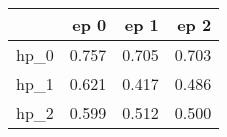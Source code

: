 \begin{tabular}{lrrr}
\toprule
{} &   ep 0 &   ep 1 &   ep 2 \\
\midrule
hp\_0 &  0.757 &  0.705 &  0.703 \\
hp\_1 &  0.621 &  0.417 &  0.486 \\
hp\_2 &  0.599 &  0.512 &  0.500 \\
\bottomrule
\end{tabular}

